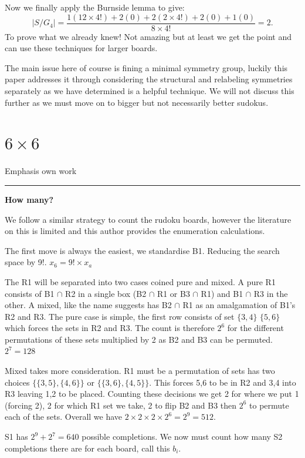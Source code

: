 \documentclass[a4paper,11pt]{report}
\newcounter{row}
\begin{document}
{Now we finally apply the Burnside lemma to give:
\begin{equation}|S/G_4|=\frac{1(12\times 4!)+ 2(0)+2(2\times 4!)+2(0)+1(0)}{8\times 4!}=2.\end{equation}
To prove what we already knew! Not amazing but at least we get the point and can use these techniques for larger boards.

The main issue here of course is fining a minimal symmetry group, luckily this paper addresses it \cite{minimal complete shidoku symmetry groups} through considering the structural and relabeling symmetries separately as we have determined is a helpful technique. We will not discuss this further as we must move on to bigger but not necessarily better sudokus.

	\section{$6 \times 6$}
	
Emphasis own work 
\noindent\rule{4cm}{0.4pt}
\textbf{How many?}

We follow a similar strategy to count the rudoku boards, however the literature on this is limited and this author provides the enumeration calculations. 

The first move is always the easiest, we standardise B1. Reducing the search space by 9!.  $x_6=9!\times x_a$

The R1 will be separated into two cases coined pure and mixed. A pure R1 consists of B1 $\cap$ R2 in a single box (B2 $\cap$ R1 or B3 $\cap$ R1) and B1 $\cap$ R3 in the other. A mixed, like the name suggests has B2 $\cap$ R1 as an amalgamation of B1's R2 and R3. The pure case is simple, the first row consists of set $\{3,4\}$ $\{5,6\}$ which forces the sets in R2 and R3. The count is therefore $2^6$ for the different permutations of these sets multiplied by 2 as B2 and B3 can be permuted. $2^7=128$

Mixed takes more consideration. R1 must be a permutation of sets has two choices $\{\{3,5\},\{4,6\}\}$ or $\{\{3,6\},\{4,5\}\}$. This forces 5,6 to be in R2 and 3,4 into R3 leaving 1,2 to be placed. Counting these decisions we get 2 for where we put 1 (forcing 2), 2 for which R1 set we take, 2 to flip B2 and B3 then $2^6$ to permute each of the sets. Overall we have $2\times 2 \times 2 \times 2^6=2^9=512$. 

S1 has $2^9+2^7=640$ possible completions. We now must count how many S2 completions there are for each board, call this $b_i$.

}
\end{document}
